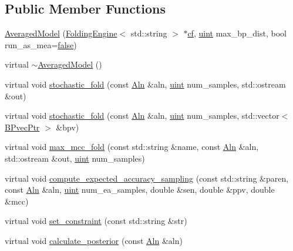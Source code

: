 \subsection*{Public Member Functions}
\begin{DoxyCompactItemize}
\item 
\hyperlink{class_averaged_model_a3d502ea18660e17aba329747eafd84a9}{Averaged\+Model} (\hyperlink{class_folding_engine}{Folding\+Engine}$<$ std\+::string $>$ $\ast$\hyperlink{notespace_8cpp_ace32c53d52804f2843ccfe220db6038c}{cf}, \hyperlink{cyktable_8h_a91ad9478d81a7aaf2593e8d9c3d06a14}{uint} max\+\_\+bp\+\_\+dist, bool run\+\_\+as\+\_\+mea=\hyperlink{naview_8c_a65e9886d74aaee76545e83dd09011727}{false})
\item 
virtual \hyperlink{class_averaged_model_a2539e2282f0f4bb70145f9fb19bc2567}{$\sim$\+Averaged\+Model} ()
\item 
virtual void \hyperlink{class_averaged_model_a8b07acaf0d63c249cdc78dc1b2df7307}{stochastic\+\_\+fold} (const \hyperlink{class_aln}{Aln} \&aln, \hyperlink{cyktable_8h_a91ad9478d81a7aaf2593e8d9c3d06a14}{uint} num\+\_\+samples, std\+::ostream \&out)
\item 
virtual void \hyperlink{class_averaged_model_a65ce78340130f4ddb19b0b5782244a1b}{stochastic\+\_\+fold} (const \hyperlink{class_aln}{Aln} \&aln, \hyperlink{cyktable_8h_a91ad9478d81a7aaf2593e8d9c3d06a14}{uint} num\+\_\+samples, std\+::vector$<$ \hyperlink{folding__engine_8h_ad0a64ba9a92681778af5917fd1bbd40c}{B\+Pvec\+Ptr} $>$ \&bpv)
\item 
virtual void \hyperlink{class_averaged_model_a4844fe73e623329659ab409d8acede57}{max\+\_\+mcc\+\_\+fold} (const std\+::string \&name, const \hyperlink{class_aln}{Aln} \&aln, std\+::ostream \&out, \hyperlink{cyktable_8h_a91ad9478d81a7aaf2593e8d9c3d06a14}{uint} num\+\_\+samples)
\item 
virtual void \hyperlink{class_averaged_model_a45c8b5f77c83da55a8f19660b9319e03}{compute\+\_\+expected\+\_\+accuracy\+\_\+sampling} (const std\+::string \&paren, const \hyperlink{class_aln}{Aln} \&aln, \hyperlink{cyktable_8h_a91ad9478d81a7aaf2593e8d9c3d06a14}{uint} num\+\_\+ea\+\_\+samples, double \&sen, double \&ppv, double \&mcc)
\item 
virtual void \hyperlink{class_averaged_model_a0a261a8fe29b8b7bd00acf7eaeecf396}{set\+\_\+constraint} (const std\+::string \&str)
\item 
virtual void \hyperlink{class_averaged_model_ab594bb3e99a3e07efcdda8cf5ca001ab}{calculate\+\_\+posterior} (const \hyperlink{class_aln}{Aln} \&aln)
\end{DoxyCompactItemize}
